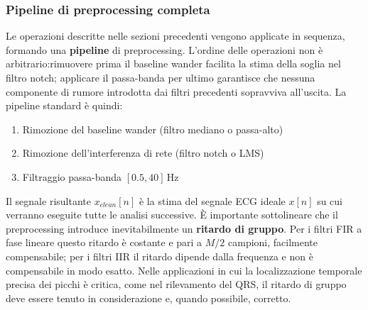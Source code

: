 \subsubsection{Pipeline di preprocessing completa}
Le operazioni descritte nelle sezioni precedenti vengono applicate in sequenza, formando una \textbf{pipeline} di preprocessing. L'ordine delle operazioni non è arbitrario:rimuovere prima il baseline wander facilita la stima della soglia nel filtro notch; applicare il passa-banda per ultimo garantisce che nessuna componente di rumore introdotta dai filtri precedenti sopravviva all'uscita. La pipeline standard è quindi:

\begin{enumerate}
	\item Rimozione del baseline wander (filtro mediano o passa-alto)
	\item Rimozione dell'interferenza di rete (filtro notch o LMS)
	\item Filtraggio passa-banda $[0.5, 40]\,\text{Hz}$
\end{enumerate}

Il segnale risultante $x_{clean}[n]$ è la stima del segnale ECG ideale $x[n]$ su cui verranno eseguite tutte le analisi successive. È importante sottolineare che il preprocessing introduce inevitabilmente un \textbf{ritardo di gruppo}. Per i filtri FIR a fase lineare questo ritardo è costante e pari a $M/2$ campioni, facilmente compensabile; per i filtri IIR il ritardo dipende dalla frequenza e non è compensabile in modo esatto. Nelle applicazioni in cui la localizzazione temporale precisa dei picchi è critica, come nel rilevamento del QRS, il ritardo di gruppo deve essere tenuto in considerazione e, quando possibile, corretto.